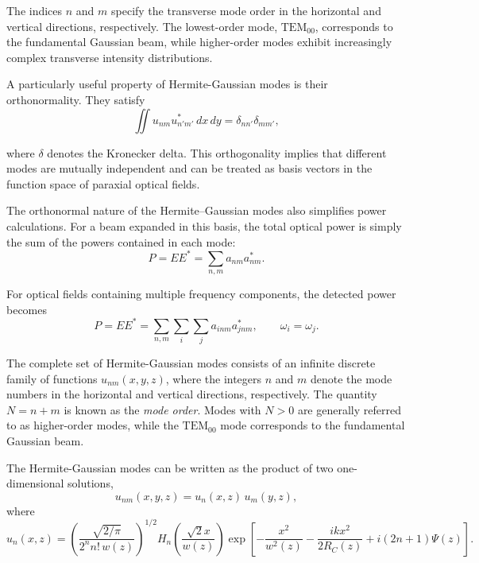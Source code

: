 \documentclass{report}
\begin{document}
The indices $n$ and $m$ specify the transverse mode order in the horizontal and vertical directions, respectively. The lowest-order mode, $\mathrm{TEM}_{00}$, corresponds to the fundamental Gaussian beam, while higher-order modes exhibit increasingly complex transverse intensity distributions.

A particularly useful property of Hermite-Gaussian modes is their orthonormality. They satisfy
\begin{equation}
\iint
u_{nm}
u_{n'm'}^{*}
\,dx\,dy
=
\delta_{nn'}
\delta_{mm'},
\end{equation}

where $\delta$ denotes the Kronecker delta. This orthogonality implies that different modes are mutually independent and can be treated as basis vectors in the function space of paraxial optical fields.

The orthonormal nature of the Hermite--Gaussian modes also simplifies power calculations. For a beam expanded in this basis, the total optical power is simply the sum of the powers contained in each mode:
\begin{equation}
P
=
EE^{*}
=
\sum_{n,m}
a_{nm}a_{nm}^{*}.
\end{equation}

For optical fields containing multiple frequency components, the detected power becomes
\begin{equation}
P
=
EE^{*}
=
\sum_{n,m}
\sum_i
\sum_j
a_{inm}a_{jnm}^{*},
\qquad
\omega_i=\omega_j.
\end{equation}

The complete set of Hermite-Gaussian modes consists of an infinite discrete family of functions $u_{nm}(x,y,z)$, where the integers $n$ and $m$ denote the mode numbers in the horizontal and vertical directions, respectively. The quantity $N = n+m$ is known as the \textit{mode order}. Modes with $N>0$ are generally referred to as higher-order modes, while the $\mathrm{TEM}_{00}$ mode corresponds to the fundamental Gaussian beam.

The Hermite-Gaussian modes can be written as the product of two one-dimensional solutions,
\begin{equation}
u_{nm}(x,y,z)
=
u_n(x,z)\,u_m(y,z),
\end{equation}
where
\begin{equation}
u_n(x,z)
=
\left(
\frac{\sqrt{2/\pi}}
     {2^n n! \, w(z)}
\right)^{1/2}
H_n\!\left(
\frac{\sqrt{2}x}{w(z)}
\right)
\exp\!\left[
-\frac{x^2}{w^2(z)}
-\frac{ikx^2}{2R_C(z)}
+i(2n+1)\Psi(z)
\right].
\end{equation}
\end{document}
